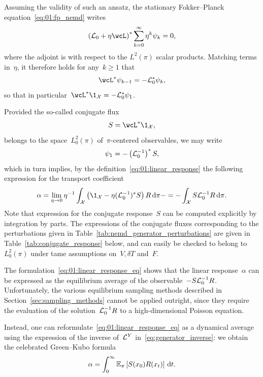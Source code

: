 Assuming the validity of such an ansatz, the stationary Fokker--Planck equation~\eqref{eq:01:fp_nemd} writes
\begin{equation}
    \label{eq:01:fp_equation_formal}
    \left(\cL_0+\eta\wcL\right)^*\sum_{k=0}^\infty \eta^k\psi_k=0,
\end{equation}
where the adjoint is with respect to the $L^2(\pi)$ scalar products.
Matching terms in~$\eta$, it therefore holds for any~$k\geq 1$ that
\begin{equation}
    \wcL^*\psi_{k-1}=-\cL_0^*\psi_k,
\end{equation}
so that in particular~$\wcL^*\1_{\cX}=-\cL_0^*\psi_1$. 

Provided the so-called conjugate flux
\begin{align}
\label{eq:conjugate_flux}
    S=\wcL^*\1_{\cX},
\end{align} 
belongs to the space~$L_0^2(\pi)$ of~$\pi$-centered observables, we may write
\begin{equation}\label{eq:psi_1}
    \psi_1=-\left(\mathcal{L}_0^{-1}\right)^*S,
\end{equation}
which in turn implies, by the definition~\eqref{eq:01:linear_response} the following expression for the transport coefficient
\begin{equation}
\label{eq:01:linear_response_eq}
    \alpha = \underset{\eta\to 0}{\lim}\,\eta^{-1}\int_{\cX}\left(\1_{\cX}-\eta(\cL_0^{-1})^*S\right)R\,\d \pi- =-\int_{\cX}S\cL_0^{-1}R\,\d\pi.
\end{equation}
Note that expression for the conjugate response~$S$ can be computed explicitly by integration by parts. The expressions of the conjugate fluxes corresponding to the perturbations given in Table~\ref{tab:nemd_generator_perturbations} are given in Table~\ref{tab:conjugate_response} below, and can easily be checked to belong to~$L_0^2(\pi)$ under tame assumptions on~$V,\delta T$ and~$F$.

The formulation~\eqref{eq:01:linear_response_eq} shows that the linear response~$\alpha$ can be expressed as the equilibrium average of the observable~$-S\mathcal{L}_0^{-1}R$. Unfortunately, the various equilibrium sampling methods described in Section~\ref{sec:sampling_methods} cannot be applied outright, since they require the evaluation of the solution~$\mathcal{L}_0^{-1}R$ to a high-dimensional Poisson equation.

Instead, one can reformulate~\eqref{eq:01:linear_response_eq} as a dynamical average using the expression of the inverse of~$\mathcal{L}^Y$ in~\eqref{eq:generator_inverse}: we obtain the celebrated Green--Kubo formula
\begin{equation}
    \label{eq:01:green_kubo}
    \alpha = \int_{0}^\infty\mathbb{E}_{\pi}\left[S(x_0)R(x_t)\right]\,\mathrm{d} t.
\end{equation}


